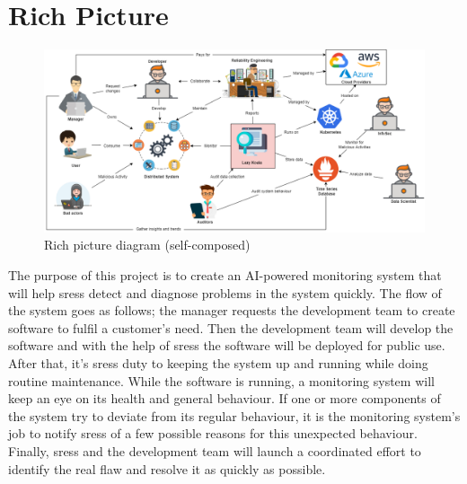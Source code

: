 \section{Rich Picture}

\begin{figure}[H]
    \includegraphics[width=16cm]{assets/requirement-specification/rich-picture.png}
    \caption{Rich picture diagram (self-composed)}
    \label{fig:rich-picture}
\end{figure}

The purpose of this project is to create an AI-powered monitoring system that will help \acp{sres} detect and diagnose problems in the system quickly. The flow of the system goes as follows; the manager requests the development team to create software to fulfil a customer's need. Then the development team will develop the software and with the help of \acp{sres} the software will be deployed for public use. After that, it's \acp{sres} duty to keeping the system up and running while doing routine maintenance. While the software is running, a monitoring system will keep an eye on its health and general behaviour. If one or more components of the system try to deviate from its regular behaviour, it is the monitoring system's job to notify \acp{sres} of a few possible reasons for this unexpected behaviour. Finally, \acp{sres} and the development team will launch a coordinated effort to identify the real flaw and resolve it as quickly as possible. 